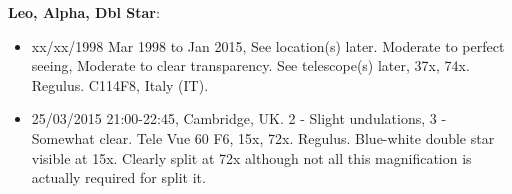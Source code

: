 {\bf Leo, Alpha, Dbl Star}:
\begin{itemize}
\item xx/xx/1998 Mar 1998 to Jan 2015, See location(s) later. Moderate to perfect seeing, Moderate to clear transparency. See telescope(s) later, 37x, 74x. Regulus. C114F8, Italy (IT).
\item 25/03/2015 21:00-22:45, Cambridge, UK. 2 - Slight undulations, 3 - Somewhat clear. Tele Vue 60 F6, 15x, 72x. Regulus. Blue-white double star visible at 15x. Clearly split at 72x although not all this magnification is actually required for split it.
\end{itemize}

